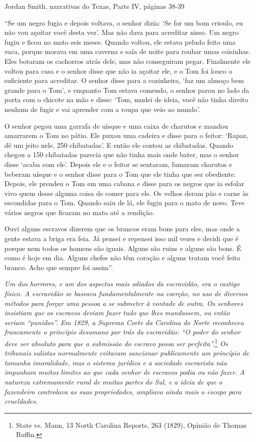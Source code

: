 Jordan Smith, narrativas do Texas, Parte IV, páginas 38-39

``Se um negro fugia e depois voltava, o senhor dizia: `Se for um bom
crioulo, eu não vou açoitar você desta vez'. Mas não dava para acreditar
nisso. Um negro fugiu e ficou no mato seis meses. Quando voltou, ele
estava peludo feito uma vaca, porque morava em uma caverna e saía de
noite para roubar umas coisinhas. Eles botaram os cachorros atrás dele,
mas não conseguiram pegar. Finalmente ele voltou para casa e o senhor
disse que não ia açoitar ele, e o Tom foi louco o suficiente para
acreditar. O senhor disse para a cozinheira, `faz um almoço bem grande
para o Tom', e enquanto Tom estava comendo, o senhor parou no lado da
porta com o chicote na mão e disse: `Tom, mudei de ideia, você não tinha
direito nenhum de fugir e vai aprender com a roupa que veio ao mundo'.

O senhor pegou uma garrafa de uísque e uma caixa de charutos e mandou
amarrarem o Tom no pátio. Ele puxou uma cadeira e disse para o feitor:
`Rapaz, dê um jeito nele, 250 chibatadas'. E então ele contou as
chibatadas. Quando chegou a 150 chibatadas parecia que não tinha mais
onde bater, mas o senhor disse `acaba com ele'. Depois ele e o feitor se
sentaram, fumaram charutos e beberam uísque e o senhor disse para o Tom
que ele tinha que ser obediente. Depois, ele prendeu o Tom em uma cabana
e disse para os negros que ia esfolar vivo quem desse alguma coisa de
comer para ele. Os velhos deram pão e carne às escondidas para o Tom.
Quando saiu de lá, ele fugiu para o mato de novo. Teve vários negros que
ficaram no mato até a rendição.

Ouvi alguns escravos dizerem que os brancos eram bons para eles, mas
onde a gente estava a briga era feia. Já pensei e repensei isso mil
vezes e decidi que é porque nem todos os homens são iguais. Alguns são
ruins e alguns são bons. É como é hoje em dia. Alguns chefes não têm
coração e alguns tratam você feito branco. Acho que sempre foi assim''.

\emph{Um dos horrores, e um dos aspectos mais odiados da escravidão, era
o castigo físico. A escravidão se baseava fundamentalmente na coerção,
no uso de diversos métodos para forçar uma pessoa a se submeter à
vontade de outra. Os senhores insistiam que os escravos deviam fazer
tudo que lhes mandassem, ou então seriam ``punidos''. Em 1829, a Suprema
Corte da Carolina do Norte reconheceu francamente o princípio desumano
por trás da escravidão: ``O poder do senhor deve ser absoluto para que a
submissão do escravo possa ser perfeita''.}\footnote{State vs. Mann, 13
  North Carolina Reports, 263 (1829), Opinião de Thomas Ruffin.}
\emph{Os tribunais sulistas normalmente evitavam sancionar publicamente
um princípio de tamanha imoralidade, mas o sistema jurídico e a
sociedade escravista não impunham muitos limites ao que cada senhor de
escravos podia ou não fazer. A natureza extremamente rural de muitas
partes do Sul, e a ideia de que o fazendeiro controlava as suas
propriedades, ampliava ainda mais o escopo para crueldades.}

